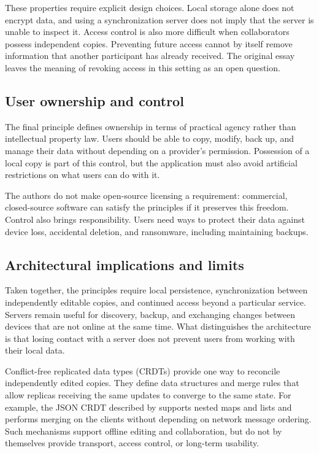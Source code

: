 These properties require explicit design choices.
Local storage alone does not encrypt data, and using a synchronization server does not imply that the server is unable to inspect it.
Access control is also more difficult when collaborators possess independent copies.
Preventing future access cannot by itself remove information that another participant has already received.
The original essay leaves the meaning of revoking access in this setting as an open question.
\parencite{local-first-software}

\subsection{User ownership and control}

The final principle defines ownership in terms of practical agency rather than intellectual property law.
Users should be able to copy, modify, back up, and manage their data without depending on a provider's permission.
Possession of a local copy is part of this control, but the application must also avoid artificial restrictions on what users can do with it.
\parencite{local-first-software}

The authors do not make open-source licensing a requirement: commercial, closed-source software can satisfy the principles if it preserves this freedom.
Control also brings responsibility.
Users need ways to protect their data against device loss, accidental deletion, and ransomware, including maintaining backups.
\parencite{local-first-software}

\subsection{Architectural implications and limits}

Taken together, the principles require local persistence, synchronization between independently editable copies, and continued access beyond a particular service.
Servers remain useful for discovery, backup, and exchanging changes between devices that are not online at the same time.
What distinguishes the architecture is that losing contact with a server does not prevent users from working with their local data.
\parencite{local-first-software}

Conflict-free replicated data types (CRDTs) provide one way to reconcile independently edited copies.
They define data structures and merge rules that allow replicas receiving the same updates to converge to the same state.
For example, the JSON CRDT described by \textcite{json-crdt} supports nested maps and lists and performs merging on the clients without depending on network message ordering.
Such mechanisms support offline editing and collaboration, but do not by themselves provide transport, access control, or long-term usability.

